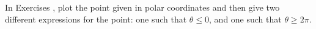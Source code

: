 {\noindent In Exercises}
{, plot the point given in polar coordinates and then give two different expressions for the point: one such that $\theta \leq 0$, and one such that $\theta \geq 2\pi$.}
